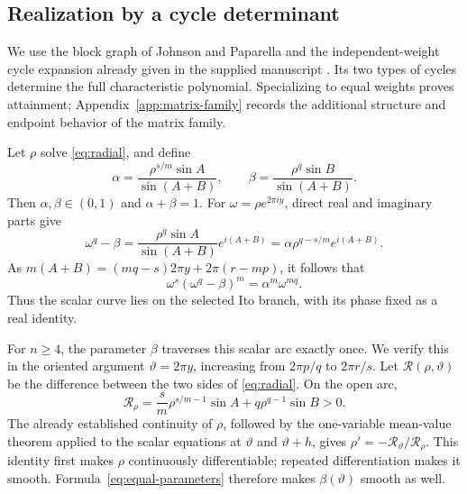 \documentclass[11pt,a4paper]{article}
\theoremstyle{definition}
\theoremstyle{remark}
\numberwithin{equation}{section}
\begin{document}

\subsection{Realization by a cycle determinant}
We use the block graph of Johnson and Paparella
\cite[Theorem~3.2]{JP} and the independent-weight cycle expansion already
given in the supplied manuscript \cite[Theorem~7.6]{VG}. Its two types
of cycles determine the full characteristic polynomial. Specializing to
equal weights proves attainment; Appendix~\ref{app:matrix-family} records
the additional structure and endpoint behavior of the matrix family.

Let $\rho$ solve \eqref{eq:radial}, and define
\begin{equation}\label{eq:equal-parameters}
 \alpha=\frac{\rho^{s/m}\sin A}{\sin(A+B)},\qquad
 \beta=\frac{\rho^q\sin B}{\sin(A+B)}.
\end{equation}
Then $\alpha,\beta\in(0,1)$ and $\alpha+\beta=1$.
For $\omega=\rho e^{2\pi i y}$, direct real and imaginary parts give
\begin{equation}\label{eq:factor-resolution}
 \omega^q-\beta
   =\frac{\rho^q\sin A}{\sin(A+B)}e^{i(A+B)}
   =\alpha\rho^{q-s/m}e^{i(A+B)}.
\end{equation}
As $m(A+B)=(mq-s)2\pi y+2\pi(r-mp)$, it follows that
\begin{equation}\label{eq:ito-attaining}
 \omega^s(\omega^q-\beta)^m=\alpha^m\omega^{mq}.
\end{equation}
Thus the scalar curve lies on the selected Ito branch, with its phase fixed as a real identity.

For $n\ge4$, the parameter $\beta$ traverses this scalar arc exactly
once. We verify this in the oriented argument $\vartheta=2\pi y$,
increasing from $2\pi p/q$ to $2\pi r/s$.
Let $\mathcal R(\rho,\vartheta)$ be the difference between the two
sides of \eqref{eq:radial}. On the open arc,
\[
 \mathcal R_\rho
 =\frac{s}{m}\rho^{s/m-1}\sin A+q\rho^{q-1}\sin B>0.
\]
The already established continuity of $\rho$, followed by the
one-variable mean-value theorem applied to the scalar equations at
$\vartheta$ and $\vartheta+h$, gives
$\rho'=-\mathcal R_\vartheta/\mathcal R_\rho$.
This identity first makes $\rho$ continuously differentiable;
repeated differentiation makes it smooth. Formula~\eqref{eq:equal-parameters}
therefore makes $\beta(\vartheta)$ smooth as well.
\end{document}
